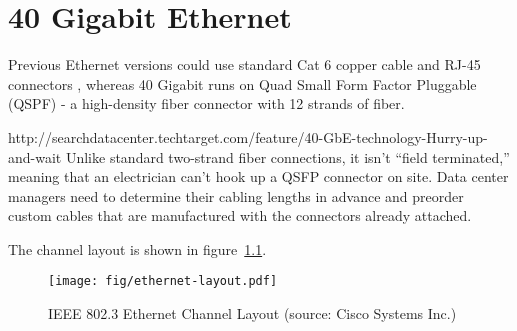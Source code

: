 
\chapter{40 Gigabit Ethernet}
Previous Ethernet versions could use standard Cat 6 copper cable and RJ-45 connectors , %
whereas 40 Gigabit runs on Quad Small Form Factor Pluggable (QSPF) - a high-density fiber connector with 12 strands of fiber.

http://searchdatacenter.techtarget.com/feature/40-GbE-technology-Hurry-up-and-wait
Unlike standard two-strand fiber connections, it isn’t “field terminated,” meaning that an electrician can’t hook up a QSFP connector on site. Data center managers need to determine their cabling lengths in advance and preorder custom cables that are manufactured with the connectors already attached.


The channel layout is shown in figure~\ref{fig:40gbit-ethernet-layout}.

\begin{figure}
	\centering
	\texttt{[image: fig/ethernet-layout.pdf]}
	\caption{IEEE 802.3 Ethernet Channel Layout (source: Cisco Systems Inc.)}
	\label{fig:40gbit-ethernet-layout}
	\bigskip
\end{figure}
